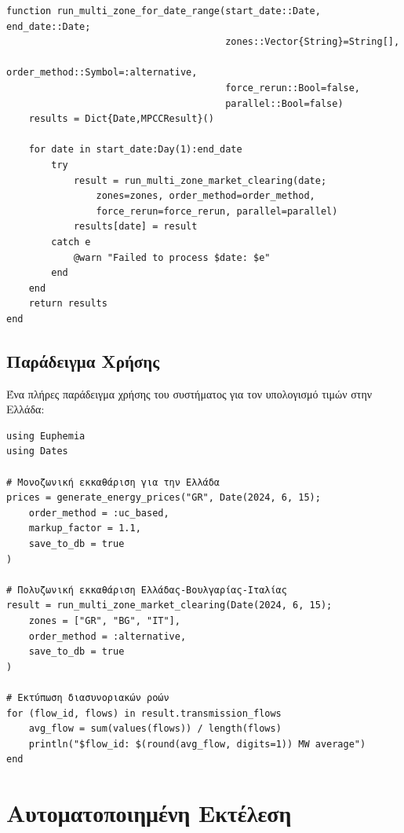 \begin{samepage}
\begin{verbatim}
function run_multi_zone_for_date_range(start_date::Date, end_date::Date;
                                       zones::Vector{String}=String[],
                                       order_method::Symbol=:alternative,
                                       force_rerun::Bool=false,
                                       parallel::Bool=false)
    results = Dict{Date,MPCCResult}()

    for date in start_date:Day(1):end_date
        try
            result = run_multi_zone_market_clearing(date;
                zones=zones, order_method=order_method,
                force_rerun=force_rerun, parallel=parallel)
            results[date] = result
        catch e
            @warn "Failed to process $date: $e"
        end
    end
    return results
end
\end{verbatim}
\end{samepage}

\subsection{Παράδειγμα Χρήσης}
\label{subsec:usage-example}

Ένα πλήρες παράδειγμα χρήσης του συστήματος για τον υπολογισμό τιμών στην Ελλάδα:

\begin{samepage}
\begin{verbatim}
using Euphemia
using Dates

# Μονοζωνική εκκαθάριση για την Ελλάδα
prices = generate_energy_prices("GR", Date(2024, 6, 15);
    order_method = :uc_based,
    markup_factor = 1.1,
    save_to_db = true
)

# Πολυζωνική εκκαθάριση Ελλάδας-Βουλγαρίας-Ιταλίας
result = run_multi_zone_market_clearing(Date(2024, 6, 15);
    zones = ["GR", "BG", "IT"],
    order_method = :alternative,
    save_to_db = true
)

# Εκτύπωση διασυνοριακών ροών
for (flow_id, flows) in result.transmission_flows
    avg_flow = sum(values(flows)) / length(flows)
    println("$flow_id: $(round(avg_flow, digits=1)) MW average")
end
\end{verbatim}
\end{samepage}


\section{Αυτοματοποιημένη Εκτέλεση}
\label{sec:automated-execution}

